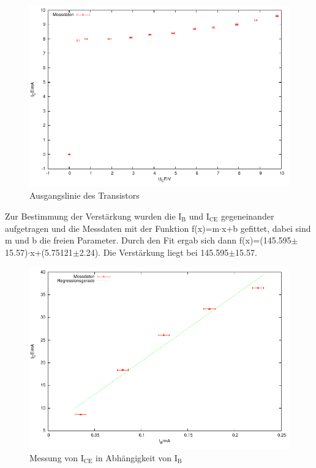 \documentclass[12pt,a4paper]{article}
\begin{document}
\begin{figure}[H] 
  \centering
    \includegraphics[scale = 0.7]{a_a.pdf}
  	\caption[Ausgangslinie des Transistors]{Ausgangslinie des Transistors}
  \label{fig:a_a}
\end{figure}

Zur Bestimmung der Verstärkung wurden die I$_\text{B}$ und I$_\text{CE}$ gegeneinander aufgetragen und die Messdaten mit der Funktion f(x)=m$\cdot$x+b gefittet, dabei sind m und b die freien Parameter. Durch den Fit ergab sich dann f(x)=(145.595$\pm$15.57)$\cdot$x+(5.75121$\pm$2.24). Die Verstärkung liegt bei 145.595$\pm$15.57.

\begin{figure}[H] 
  \centering
    \includegraphics[scale = 0.7]{a_v.pdf}
  	\caption[Messung von I$_\text{CE}$ in Abhängigkeit von I$_\text{B}$]{Messung von I$_\text{CE}$ in Abhängigkeit von I$_\text{B}$}
  \label{fig:a_v}
\end{figure}
\end{document}
